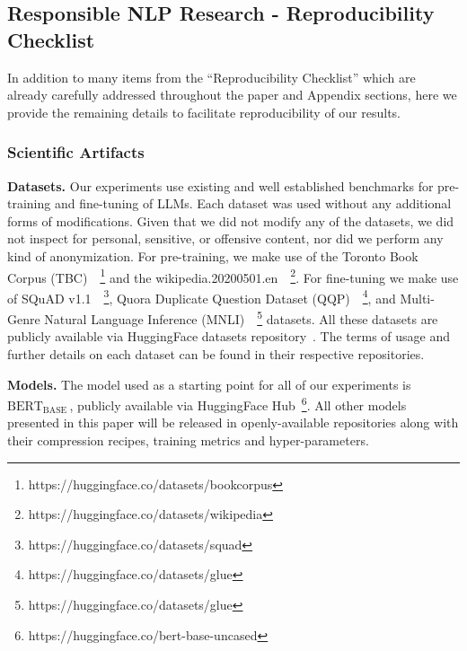 \documentclass[11pt]{article}
\newcommand{\bert}{$\textrm{BERT}_{\textrm{BASE}}\,$}
\begin{document}
\subsection{Responsible NLP Research - Reproducibility Checklist}

In addition to many items from the ``Reproducibility Checklist'' which are already carefully addressed throughout the paper and Appendix sections, here we provide the remaining details to facilitate reproducibility of our results.

\subsubsection{Scientific Artifacts}
\noindent\textbf{Datasets.} Our experiments use existing and well established benchmarks for pre-training and fine-tuning of LLMs. Each dataset was used without any additional forms of modifications. Given that we did not modify any of the datasets, we did not inspect for personal, sensitive, or offensive content, nor did we perform any kind of anonymization. For pre-training, we make use of the Toronto Book Corpus (TBC)~\cite{Zhu2015AligningBA}~\footnote{https://huggingface.co/datasets/bookcorpus} and the wikipedia.20200501.en~\cite{wikidump}~\footnote{https://huggingface.co/datasets/wikipedia}. For fine-tuning we make use of SQuAD v1.1~\cite{Rajpurkar2016SQuAD1Q}~\footnote{https://huggingface.co/datasets/squad}, Quora Duplicate Question Dataset (QQP)~\cite{Shankar2017IdentifyingQQ}~\footnote{ https://huggingface.co/datasets/glue}, and Multi-Genre Natural Language Inference (MNLI)~\cite{N18-1101}~\footnote{ https://huggingface.co/datasets/glue} datasets. All these datasets are publicly available via HuggingFace datasets repository~\cite{hf-datasets}. The terms of usage and further details on each dataset can be found in their respective repositories.

\noindent\textbf{Models.} The model used as a starting point for all of our experiments is \bert, publicly available via HuggingFace Hub~\footnote{https://huggingface.co/bert-base-uncased}. All other models presented in this paper will be released in openly-available repositories along with their compression recipes, training metrics and hyper-parameters.
\end{document}
